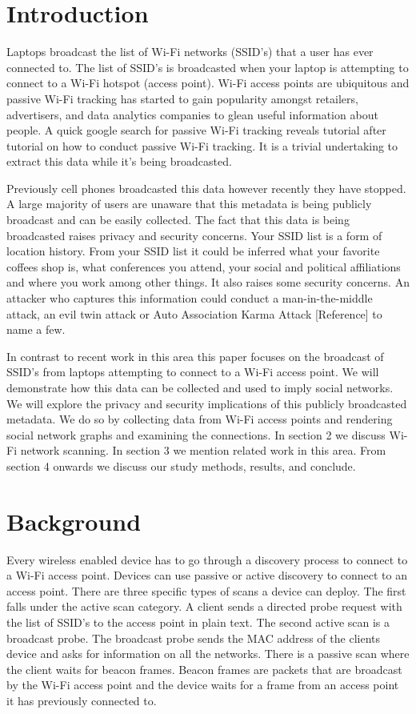 \documentclass[letterpaper,twocolumn,10pt]{article}
\begin{document}
\section{Introduction}
Laptops broadcast the list of Wi-Fi networks (SSID's) that a user has ever connected to. The list of SSID's is broadcasted when your laptop is attempting to connect to a Wi-Fi hotspot (access point). Wi-Fi access points are ubiquitous and passive Wi-Fi tracking has started to gain popularity amongst retailers, advertisers, and data analytics companies to glean useful information about people. A quick google search for passive Wi-Fi tracking reveals tutorial after tutorial on how to conduct passive Wi-Fi tracking. It is a trivial undertaking to extract this data while it's being broadcasted.  

Previously cell phones broadcasted this data however recently they have stopped. A large majority of users are unaware that this metadata is being publicly broadcast and can be easily collected. The fact that this data is being broadcasted raises privacy and security concerns. Your SSID list is a form of location history. From your SSID list it could be inferred what your favorite coffees shop is, what conferences you attend, your social and political affiliations and where you work among other things. It also raises some security concerns. An attacker who captures this information could conduct a man-in-the-middle attack, an evil twin attack or Auto Association Karma Attack [Reference] to name a few. 

In contrast to recent work in this area this paper focuses on the broadcast of SSID's from laptops attempting to connect to a Wi-Fi access point. We will demonstrate how this data can be collected and used to imply social networks. We will explore the privacy and security implications of this publicly broadcasted metadata. We do so by collecting data from Wi-Fi access points and rendering social network graphs and examining the connections. In section 2 we discuss Wi-Fi network scanning. In section 3 we mention related work in this area. From section 4 onwards we discuss our study methods, results, and conclude.



\section{Background}
Every wireless enabled device has to go through a discovery process to connect to a Wi-Fi access point. Devices can use passive or active discovery to connect to an access point. There are three specific types of scans a device can deploy. The first falls under the active scan category. A client sends a directed probe request with the list of SSID's to the access point in plain text. The second active scan is a broadcast probe. The broadcast probe  sends the MAC address of the clients device and asks for information on all the networks. There is a passive scan where the client waits for beacon frames. Beacon frames are packets that are broadcast by the Wi-Fi access point and the device waits for a frame from an access point it has previously connected to. 
\end{document}
